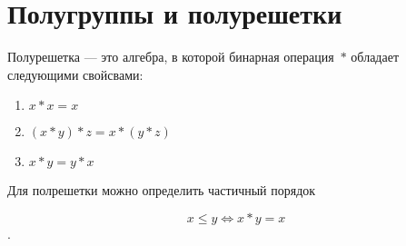 \chapter{Полугруппы и полурешетки}

\begin{my_def}
Полурешетка --- это алгебра, в которой бинарная операция~$*$ обладает следующими свойсвами:

\begin{enumerate}
\item $x*x=x$
\item $(x*y)*z=x*(y*z)$
\item $x*y=y*x$
\end{enumerate}

\end{my_def}

Для полрешетки можно определить частичный порядок 

$$x \leq y \Leftrightarrow x*y=x$$.

